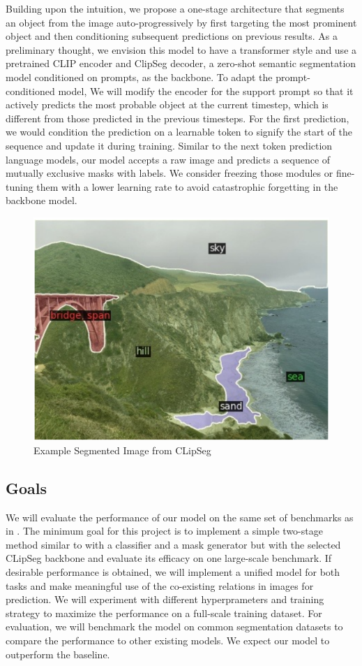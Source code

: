 \documentclass[10pt,twocolumn,letterpaper]{article}
\begin{document}
Building upon the intuition, we propose a one-stage architecture that segments an object from the image auto-progressively by first targeting the most prominent object and then conditioning subsequent predictions on previous results. As a preliminary thought, we envision this model to have a transformer style and use a pretrained CLIP encoder and ClipSeg \cite{clipseg} decoder, a zero-shot semantic segmentation model conditioned on prompts, as the backbone. To adapt the prompt-conditioned model, We will modify the encoder for the support prompt so that it actively predicts the most probable object at the current timestep, which is different from those predicted in the previous timesteps. For the first prediction, we would condition the prediction on a learnable token to signify the start of the sequence and update it during training. Similar to the next token prediction language models, our model accepts a raw image and predicts a sequence of mutually exclusive masks with labels. We consider freezing those modules or fine-tuning them with a lower learning rate to avoid catastrophic forgetting in the backbone model.

\begin{figure} [h]
    \centering
    \includegraphics[width=0.5\linewidth]{images/seg_sample.png}
    \caption{Example Segmented Image from CLipSeg \cite{clipseg}}
    \label{fig:enter-label}
\end{figure}

\subsection{Goals}

We will evaluate the performance of our model on the same set of benchmarks as in \cite{simseg}. The minimum goal for this project is to implement a simple two-stage method similar to \cite{simseg} with a classifier and a mask generator but with the selected CLipSeg \cite{clipseg} backbone and evaluate its efficacy on one large-scale benchmark. If desirable performance is obtained, we will implement a unified model for both tasks and make meaningful use of the co-existing relations in images for prediction. We will experiment with different hyperprameters and training strategy to maximize the performance on a full-scale training dataset. For evaluation, we will benchmark the model on common segmentation datasets to compare the performance to other existing models. We expect our model to outperform the baseline.
\end{document}
